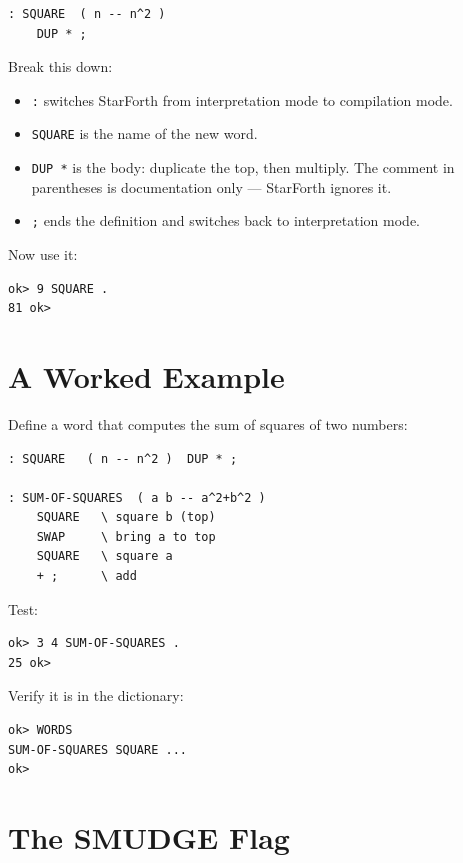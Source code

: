 \begin{lstlisting}[language=Forth]
: SQUARE  ( n -- n^2 )
    DUP * ;
\end{lstlisting}

Break this down:
\begin{itemize}
  \item \texttt{:} switches StarForth from interpretation mode to compilation
    mode.
  \item \texttt{SQUARE} is the name of the new word.
  \item \texttt{DUP *} is the body: duplicate the top, then multiply. The
    comment in parentheses is documentation only --- StarForth ignores it.
  \item \texttt{;} ends the definition and switches back to interpretation
    mode.
\end{itemize}

Now use it:

\begin{lstlisting}[language=Forth]
ok> 9 SQUARE .
81 ok>
\end{lstlisting}

\section{A Worked Example}
\label{sec:worked-example}

Define a word that computes the sum of squares of two numbers:

\begin{lstlisting}[language=Forth]
: SQUARE   ( n -- n^2 )  DUP * ;

: SUM-OF-SQUARES  ( a b -- a^2+b^2 )
    SQUARE   \ square b (top)
    SWAP     \ bring a to top
    SQUARE   \ square a
    + ;      \ add
\end{lstlisting}

Test:

\begin{lstlisting}[language=Forth]
ok> 3 4 SUM-OF-SQUARES .
25 ok>
\end{lstlisting}

Verify it is in the dictionary:

\begin{lstlisting}[language=Forth]
ok> WORDS
SUM-OF-SQUARES SQUARE ...
ok>
\end{lstlisting}

\section{The SMUDGE Flag}
\label{sec:smudge}

